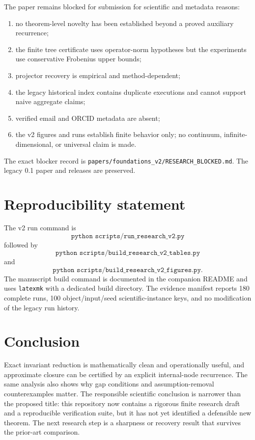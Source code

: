 \documentclass[11pt]{amsart}
\theoremstyle{definition}
\begin{document}
The paper remains blocked for submission for scientific and metadata reasons:
\begin{enumerate}[leftmargin=*]
\item no theorem-level novelty has been established beyond a proved auxiliary recurrence;
\item the finite tree certificate uses operator-norm hypotheses but the experiments use conservative Frobenius upper bounds;
\item projector recovery is empirical and method-dependent;
\item the legacy historical index contains duplicate executions and cannot support naive aggregate claims;
\item verified email and ORCID metadata are absent;
\item the v2 figures and runs establish finite behavior only; no continuum, infinite-dimensional, or universal claim is made.
\end{enumerate}

The exact blocker record is \texttt{papers/foundations\_v2/RESEARCH\_BLOCKED.md}. The legacy 0.1 paper and releases are preserved.

\section{Reproducibility statement}

The v2 run command is
\[
\texttt{python scripts/run\_research\_v2.py}
\]
followed by
\[
\texttt{python scripts/build\_research\_v2\_tables.py}
\]
and
\[
\texttt{python scripts/build\_research\_v2\_figures.py}.
\]
The manuscript build command is documented in the companion README and uses \texttt{latexmk} with a dedicated build directory. The evidence manifest reports 180 complete runs, 100 object/input/seed scientific-instance keys, and no modification of the legacy run history.

\begin{table}[t]
\centering
\caption{Reproducibility manifest.}
\label{tab:manifest}

\end{table}

\section{Conclusion}

Exact invariant reduction is mathematically clean and operationally useful, and approximate closure can be certified by an explicit internal-node recurrence. The same analysis also shows why gap conditions and assumption-removal counterexamples matter. The responsible scientific conclusion is narrower than the proposed title: this repository now contains a rigorous finite research draft and a reproducible verification suite, but it has not yet identified a defensible new theorem. The next research step is a sharpness or recovery result that survives the prior-art comparison.
\end{document}
